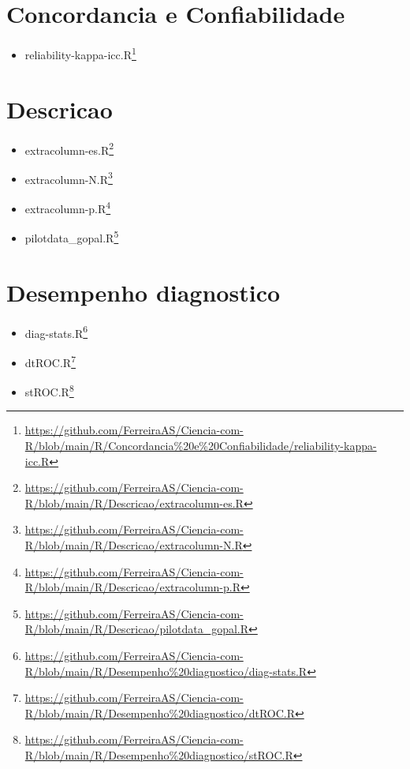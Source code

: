 \documentclass[
  a4paper,
]{book}
\providecommand{\tightlist}{%
  \setlength{\itemsep}{0pt}\setlength{\parskip}{0pt}}
\renewcommand{\href}[2]{#2\footnote{\url{#1}}}
\begin{document}
\hypertarget{concordancia-e-confiabilidade}{%
\section{Concordancia e Confiabilidade}\label{concordancia-e-confiabilidade}}

\begin{itemize}
\tightlist
\item
  \href{https://github.com/FerreiraAS/Ciencia-com-R/blob/main/R/Concordancia\%20e\%20Confiabilidade/reliability-kappa-icc.R}{reliability-kappa-icc.R}
\end{itemize}

\hypertarget{descricao}{%
\section{Descricao}\label{descricao}}

\begin{itemize}
\item
  \href{https://github.com/FerreiraAS/Ciencia-com-R/blob/main/R/Descricao/extracolumn-es.R}{extracolumn-es.R}
\item
  \href{https://github.com/FerreiraAS/Ciencia-com-R/blob/main/R/Descricao/extracolumn-N.R}{extracolumn-N.R}
\item
  \href{https://github.com/FerreiraAS/Ciencia-com-R/blob/main/R/Descricao/extracolumn-p.R}{extracolumn-p.R}
\item
  \href{https://github.com/FerreiraAS/Ciencia-com-R/blob/main/R/Descricao/pilotdata_gopal.R}{pilotdata\_gopal.R}
\end{itemize}

\hypertarget{desempenho-diagnostico}{%
\section{Desempenho diagnostico}\label{desempenho-diagnostico}}

\begin{itemize}
\item
  \href{https://github.com/FerreiraAS/Ciencia-com-R/blob/main/R/Desempenho\%20diagnostico/diag-stats.R}{diag-stats.R}
\item
  \href{https://github.com/FerreiraAS/Ciencia-com-R/blob/main/R/Desempenho\%20diagnostico/dtROC.R}{dtROC.R}
\item
  \href{https://github.com/FerreiraAS/Ciencia-com-R/blob/main/R/Desempenho\%20diagnostico/stROC.R}{stROC.R}
\end{itemize}
\end{document}
